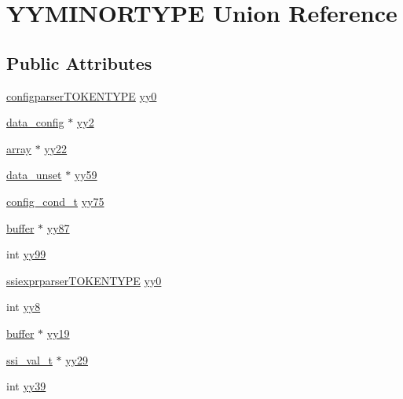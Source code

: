 \hypertarget{unionYYMINORTYPE}{\section{Y\-Y\-M\-I\-N\-O\-R\-T\-Y\-P\-E Union Reference}
\label{unionYYMINORTYPE}
}
\subsection*{Public Attributes}
\begin{DoxyCompactItemize}
\item 
\hyperlink{configparser_8c_ab1974dbdc420ccb9c13c3dbeccf1c6cf}{configparser\-T\-O\-K\-E\-N\-T\-Y\-P\-E} \hyperlink{unionYYMINORTYPE_a20e794c68d4bbfabc10b2c5d1c762d76}{yy0}
\item 
\hyperlink{structdata__config}{data\-\_\-config} $\ast$ \hyperlink{unionYYMINORTYPE_a8d80600ec339fb93669f30e1235b1508}{yy2}
\item 
\hyperlink{structarray}{array} $\ast$ \hyperlink{unionYYMINORTYPE_acb24cb1314350395bd4d90ee4ac8a8fc}{yy22}
\item 
\hyperlink{structdata__unset}{data\-\_\-unset} $\ast$ \hyperlink{unionYYMINORTYPE_a894325c839dab371d85e73fe78713efe}{yy59}
\item 
\hyperlink{array_8h_a10cc71acfa696fcbf3807d5dfa50a137}{config\-\_\-cond\-\_\-t} \hyperlink{unionYYMINORTYPE_a4a4ca1931faf6dbb20c7540be932327c}{yy75}
\item 
\hyperlink{structbuffer}{buffer} $\ast$ \hyperlink{unionYYMINORTYPE_a54ab2ffdb41322bd4d7d56e1327d3f42}{yy87}
\item 
int \hyperlink{unionYYMINORTYPE_aaa14f75383c9f52ec7c222d3a87585e8}{yy99}
\item 
\hyperlink{mod__ssi__exprparser_8c_a7269d2b49d60c17883612eccadbbc4bb}{ssiexprparser\-T\-O\-K\-E\-N\-T\-Y\-P\-E} \hyperlink{unionYYMINORTYPE_a582dd50db316a7e16828158a72ac7bd3}{yy0}
\item 
int \hyperlink{unionYYMINORTYPE_a810fb4ec5da24ae57f20bd1936634c78}{yy8}
\item 
\hyperlink{structbuffer}{buffer} $\ast$ \hyperlink{unionYYMINORTYPE_a4f4baa7c82918f20099a7914df3e1c14}{yy19}
\item 
\hyperlink{structssi__val__t}{ssi\-\_\-val\-\_\-t} $\ast$ \hyperlink{unionYYMINORTYPE_a3648227006906254944781d24406f2d3}{yy29}
\item 
int \hyperlink{unionYYMINORTYPE_afa3974d934e48984f72169ad62cf8a71}{yy39}
\end{DoxyCompactItemize}


